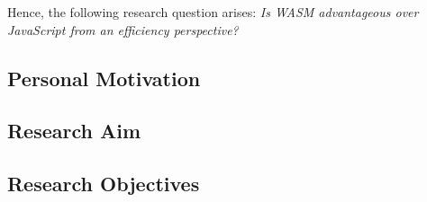 Hence, the following research question arises: \textit{Is WASM advantageous over JavaScript from an efficiency perspective?}

\subsection{Personal Motivation} \label{motivation}

\subsection{Research Aim} \label{aim}

\subsection{Research Objectives} \label{objectives}
